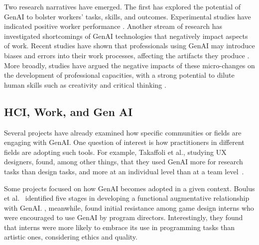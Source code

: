 Two research narratives have emerged. The first has explored the potential of GenAI to bolster workers' tasks, skills, and outcomes. Experimental studies have indicated positive worker performance \cite{Al2024,Brynjolfsson2023}. 
Another stream of research has investigated shortcomings of GenAI technologies that negatively impact aspects of work. Recent studies have shown that professionals using GenAI may introduce biases and errors into their work processes, affecting the artifacts they produce %
\cite{Kidd_Birhane_2023}. More broadly, studies have argued the negative impacts of these micro-changes on the development of professional capacities, with a strong potential to dilute human skills such as creativity and critical thinking \cite{Walczak_2023}. 

\subsection{HCI, Work, and Gen AI}
Several projects have already examined how specific communities or fields are engaging with GenAI. One question of interest is how practitioners in different fields are adopting such tools.
For example, Takaffoli et al., studying UX designers, found, among other things, that they used GenAI more for research tasks than design tasks, and more at an individual level than at a team level~\cite{takaffoli2024generative}.


Some projects focused on how GenAI becomes adopted in a given context. Boulus et al.~\cite{boulus2024genai} identified five stages in developing a functional augmentative relationship with GenAI.
\cite{22}, meanwhile, found initial resistance among game design interns who were encouraged to use GenAI by program directors. Interestingly, they found that interns were more likely to embrace its use in programming tasks than artistic ones, considering ethics and quality.

